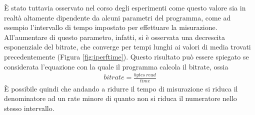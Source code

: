 \documentclass[a4paper,10pt]{article}
\begin{document}
\noindent
È stato tuttavia osservato nel corso degli esperimenti come questo valore sia in realtà altamente dipendente da alcuni parametri del programma, come ad esempio l'intervallo di tempo impostato per effettuare la misurazione. All'aumentare di questo parametro, infatti, si è osservata una decrescita esponenziale del bitrate, che converge per tempi lunghi ai valori di media trovati precedentemente (Figura \ref{fig:iperftime}). Questo risultato può essere spiegato se considerata l'equazione con la quale il programma calcola il bitrate, ossia
\begin{align}
\label{eq:br}
bitrate = \frac{bytes \ read}{time}
\end{align}
È possibile quindi che andando a ridurre il tempo di misurazione si riduca il denominatore ad un rate minore di quanto non si riduca il numeratore nello stesso intervallo. 
\end{document}
